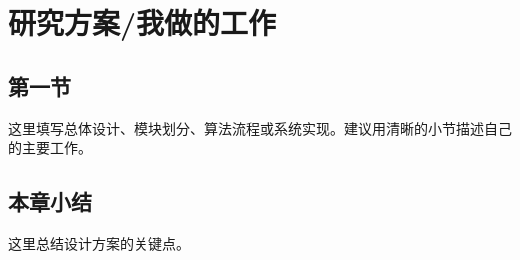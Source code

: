 \chapter{研究方案/我做的工作}

\section{第一节}

这里填写总体设计、模块划分、算法流程或系统实现。建议用清晰的小节描述自己的主要工作。

\section{本章小结}

这里总结设计方案的关键点。
